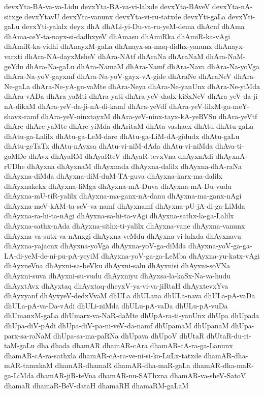 {devxYta-BA-va-va-Lidu
devxYta-BA-va-vi-lalxde
devxYta-BAveV
devxYta-nA-sitxge
devxYtavU
devxYta-vanunx
devxYta-vi-ru-tatxde
devxYti-gaLa
devxYti-gaLu
devxYti-yalalx
deyx
dhA
dhALi-yi-Du-va-ru-yeM-dema
dhAcnf
dhAma
dhAma-ceY-ta-nayx-si-dadhxyeV
dhAmasu
dhAmiRka
dhAmiR-ka-vAgi
dhAmiR-ka-vidhi
dhAnayxM-gaLa
dhAnayx-sa-maq-didhx-yanunx
dhAnayx-varxti
dhAra-NA-dayxMsheV
dhAra-NAtf
dhAraNa
dhAraNaM
dhAra-NaM-geYdu
dhAra-Na-gaLu
dhAra-NamaM
dhAra-Namf
dhAra-Nava
dhAra-Na-yoVga
dhAra-Na-yoV-gayxmf
dhAra-Na-yoV-gayx-vA-gide
dhAraNe
dhAraNeV
dhAra-Ne-gaLa
dhAra-Ne-yA-gu-vaMte
dhAra-Neya
dhAra-Ne-yanUnx
dhAra-Ne-yiMda
dhAra-vADa
dhAra-yaMti
dhAra-yati
dhAra-yeV-dadx-kiSxNeV
dhAra-yeV-da-ji-nA-dikaM
dhAra-yeV-da-ji-nA-di-kamf
dhAra-yeVdf
dhAra-yeV-lilxM-ga-meY-shavx-ramf
dhAra-yeV-ninxtayxM
dhAra-yeV-ninx-tayx-kA-yeRVSu
dhAra-yeVtf
dhAre
dhAre-yaMte
dhAre-yiMda
dhAritaM
dhAta-vashacx
dhAtu
dhAtu-gaLa
dhAtu-ga-Lalilx
dhAtu-ga-LeM-dare
dhAtu-ga-LiM-dA-gidudx
dhAtu-gaLu
dhAtu-geTaTx
dhAtu-nAyxsa
dhAtu-vi-niM-dAda
dhAtu-vi-niMda
dhAva-ti-goMDe
dhAvx
dhAyaRM
dhAyaRteV
dhAyaR-tevxVna
dhAyxnAdi
dhAyxnA-rUDhe
dhAyxna
dhAyxnaM
dhAyxnada
dhAyxna-dalilx
dhAyxna-dhA-raNa
dhAyxna-diMda
dhAyxna-diM-duM-TA-guva
dhAyxna-karx-ma-dalilx
dhAyxnakekx
dhAyxna-liMga
dhAyxna-mA-Duva
dhAyxna-mA-Du-vudu
dhAyxna-mU-tiR-yalilx
dhAyxna-ma-ganx-nA-danu
dhAyxna-ma-ganx-nAgi
dhAyxna-meV-kAM-ta-seV-va-namf
dhAyxnamf
dhAyxna-pU-jA-di-ga-LiMda
dhAyxna-ra-hi-ta-nAgi
dhAyxna-sa-hi-ta-vAgi
dhAyxna-sathx-la-ga-Lalilx
dhAyxna-sathx-nAda
dhAyxna-sithx-ti-yalilx
dhAyxna-vane
dhAyxna-vanunx
dhAyxna-va-sutx-va-nAnxgi
dhAyxna-veMdu
dhAyxna-vi-lalxda
dhAyxnavu
dhAyxna-yajacnx
dhAyxna-yoVga
dhAyxna-yoV-ga-diMda
dhAyxna-yoV-ga-ga-LA-di-yeM-de-ni-pu-pA-yeyiM
dhAyxna-yoV-ga-ga-LeMba
dhAyxna-yu-katx-vAgi
dhAyxneVna
dhAyxni-sa-beVku
dhAyxni-salu
dhAyxnisi
dhAyxni-soVNa
dhAyxni-suva
dhAyxni-su-vudu
dhAyxniyu
dhAyxsa-la-kaSx-Na-va-hudu
dhAyxtAvx
dhAyxtaq
dhAyxtaq-dheyxV-ya-vi-va-jiRtaH
dhAyxtevxYva
dhAyxyanf
dhAyxyeV-dedxVvaM
dhULa
dhULana
dhULa-nava
dhULa-pA-vaDa
dhULa-pA-va-Da-vAdi
dhULi-niMda
dhULu-pA-vaDa
dhULu-pA-vuDa
dhUmanxM-gaLa
dhUmarx-va-NaR-daMte
dhUpA-ra-ti-yanUnx
dhUpa
dhUpada
dhUpa-diV-pAdi
dhUpa-diV-pa-ni-veV-da-namf
dhUpamaM
dhUpanaM
dhUpa-parx-sa-raNaM
dhUpa-sa-ma-paRNa
dhUpava
dhUpoV
dhUtaR
dhUtaR-du-ri-taM-gaLu
dha
dhada
dhamAR
dhamAR-cAra
dhamAR-cA-ra-ga-Lanunx
dhamAR-cA-ra-sathxla
dhamAR-cA-ra-ve-ni-si-ko-LuLx-tatxde
dhamAR-dha-mAR-tamxkaM
dhamAR-dhamaR
dhamAR-dha-maR-gaLa
dhamAR-dha-maR-ga-LiMda
dhamAR-jiR-teVna
dhamAR-nu-SAThxna
dhamAR-va-sheV-SatoV
dhamaR
dhamaR-BeV-dataH
dhamaRH
dhamaRM-gaLaM
}
